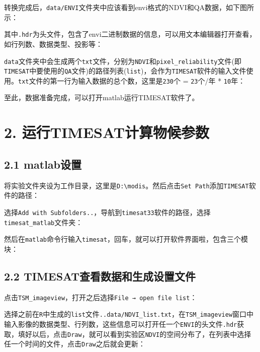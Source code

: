 \documentclass[
]{article}
\begin{document}
转换完成后，\texttt{data/ENVI}文件夹中应该看到envi格式的NDVI和QA数据，如下图所示：

其中\texttt{.hdr}为头文件，包含了envi二进制数据的信息，可以用文本编辑器打开查看，如行列数、数据类型、投影等：

\texttt{data}文件夹中会生成两个\texttt{txt}文件，分别为\texttt{NDVI}和\texttt{pixel\_reliability}文件(即\texttt{TIMESAT}中要使用的\texttt{QA}文件)的路径列表(\texttt{list})，会作为\texttt{TIMESAT}软件的输入文件使用。\texttt{txt}文件的第一行为输入数据的总个数，这里是\texttt{230}个
= \texttt{23}个/年 * \texttt{10}年：

至此，数据准备完成，可以打开matlab运行TIMESAT软件了。

\hypertarget{ux8fd0ux884ctimesatux8ba1ux7b97ux7269ux5019ux53c2ux6570}{%
\section{\texorpdfstring{\textbf{2.
运行TIMESAT计算物候参数}}{2. 运行TIMESAT计算物候参数}}\label{ux8fd0ux884ctimesatux8ba1ux7b97ux7269ux5019ux53c2ux6570}}

\hypertarget{matlabux8bbeux7f6e}{%
\subsection{2.1 matlab设置}\label{matlabux8bbeux7f6e}}

将实验文件夹设为工作目录，这里是\texttt{D:\textbackslash{}modis}。然后点击\texttt{Set\ Path}添加\texttt{TIMESAT}软件的路径：

选择\texttt{Add\ with\ Subfolders..}，导航到\texttt{timesat33}软件的路径，选择\texttt{timesat\_matlab}文件夹：

然后在\texttt{matlab}命令行输入\texttt{timesat}，回车，就可以打开软件界面啦，包含三个模块：

\hypertarget{timesatux67e5ux770bux6570ux636eux548cux751fux6210ux8bbeux7f6eux6587ux4ef6}{%
\subsection{2.2
TIMESAT查看数据和生成设置文件}\label{timesatux67e5ux770bux6570ux636eux548cux751fux6210ux8bbeux7f6eux6587ux4ef6}}

点击\texttt{TSM\_imageview}，打开之后选择\texttt{File\ →\ open\ file\ list}：

选择之前在\texttt{R}中生成的\texttt{list}文件\texttt{..data/NDVI\_list.txt}，在\texttt{TSM\_imageview}窗口中输入影像的数据类型、行列数，这些信息可以打开任一个\texttt{ENVI}的头文件\texttt{.hdr}获取，填好以后，点击\texttt{Draw}，就可以看到实验区\texttt{NDVI}的空间分布了，在列表中选择任一个时间的文件，点击\texttt{Draw}之后就会更新：
\end{document}
